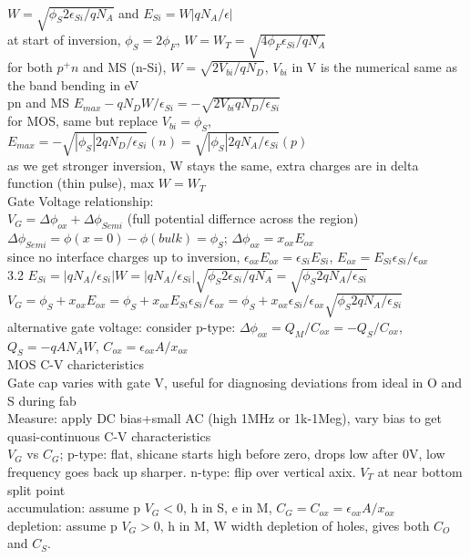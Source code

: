 \documentclass{article}
\begin{document}
\begin{large}
\\$W=\sqrt{\phi_S 2 \epsilon_{Si}/qN_A}$ and $E_{Si}=W|qN_A/\epsilon|$
\\at start of inversion, $\phi_S=2\phi_F$, $W=W_T=\sqrt{4\phi_F\epsilon_{Si}/qN_A}$
\\for both $p^+n$ and MS (n-Si), $W=\sqrt{2V_{bi}/qN_D}$, $V_{bi}$ in V is the numerical same as the band bending in eV
\\pn and MS $E_{max}-qN_DW/\epsilon_{Si}=-\sqrt{2V_{bi}qN_D/\epsilon_{Si}}$
\\for MOS, same but replace $V_{bi}=\phi_S$, $E_{max}=-\sqrt{|\phi_S|2qN_D/\epsilon_{Si}}(n)=\sqrt{|\phi_S|2qN_A/\epsilon_{Si}}(p)$
\\as we get stronger inversion, W stays the same, extra charges are in delta function (thin pulse), max $W=W_T$
\\Gate Voltage relationship:
\\$V_G=\Delta\phi_{ox}+\Delta\phi_{Semi}$ (full potential differnce across the region)
\\$\Delta\phi_{Semi}=\phi(x=0)-\phi(bulk)=\phi_S$; $\Delta\phi_{ox}=x_{ox}E_{ox}$
\\since no interface charges up to inversion, $\epsilon_{ox}E_{ox}=\epsilon_{Si}E_{Si}$, $E_{ox}=E_{Si} \epsilon_{Si}/\epsilon_{ox}$
\\3.2 $E_{Si}=|qN_A/\epsilon_{Si}|W=|qN_A/\epsilon_{Si}|\sqrt{\phi_S2\epsilon_{Si}/qN_A}=\sqrt{\phi_S2qN_A/\epsilon_{Si}}$
\\$V_G=\phi_S+x_{ox}E_{ox}=\phi_S+x_{ox}E_{Si}\epsilon_{Si}/\epsilon_{ox}=\phi_S+x_{ox}\epsilon_{Si}/\epsilon_{ox}\sqrt{\phi_S2qN_A/\epsilon_{Si}}$
\\alternative gate voltage: consider p-type: $\Delta\phi_{ox}=Q_M/C_{ox}=-Q_S/C_{ox}$, $Q_S=-q A N_A W$, $C_{ox}=\epsilon_{ox} A / x_{ox}$
\\MOS C-V charicteristics
\\Gate cap varies with gate V, useful for diagnosing deviations from ideal in O and S during fab
\\Measure: apply DC bias+small AC (high 1MHz or 1k-1Meg), vary bias to get quasi-continuous C-V characteristics
\\$V_G$ vs $C_G$; p-type: flat, shicane starts high before zero, drops low after 0V, low frequency goes back up sharper. n-type: flip over vertical axix. $V_T$ at near bottom split point
\\accumulation: assume p $V_G<0$, h in S, e in M, $C_G=C_{ox}=\epsilon_{ox} A / x_{ox}$
\\depletion: assume p $V_G>0$, h in M, W width depletion of holes, gives both $C_O$ and $C_S$.  

\end{large}
\end{document}

